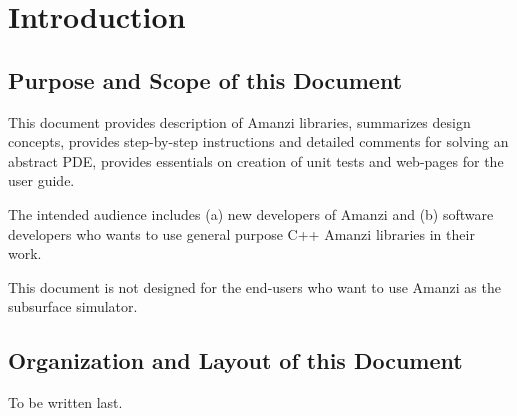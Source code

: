 
\section{Introduction}

\subsection{Purpose and Scope of this Document}
This document provides description of Amanzi libraries, summarizes design concepts,
provides step-by-step instructions and detailed comments for solving an abstract PDE,
provides essentials on creation of unit tests and web-pages for the user guide.

The intended audience includes (a) new developers of Amanzi and (b) software developers
who wants to use general purpose C++ Amanzi libraries in their work. 

This document is not designed for the end-users who want to use Amanzi as the 
subsurface simulator.


\subsection{Organization and Layout of this Document}

To be written last.






